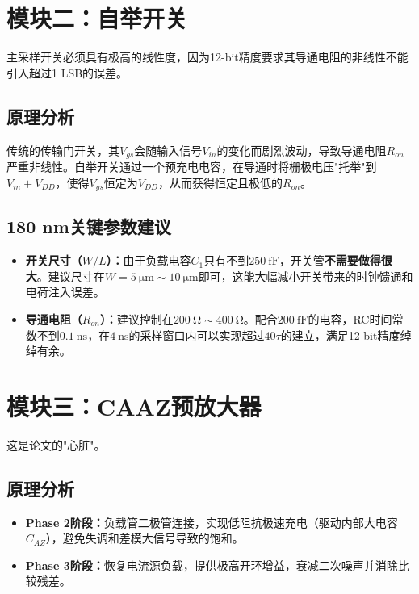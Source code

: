 \documentclass[11pt,a4paper,UTF8]{ctexart}
\begin{document}
\section{模块二：自举开关}

主采样开关必须具有极高的线性度，因为12-bit精度要求其导通电阻的非线性不能引入超过1 LSB的误差。

\subsection{原理分析}

传统的传输门开关，其$V_{gs}$会随输入信号$V_{in}$的变化而剧烈波动，导致导通电阻$R_{on}$严重非线性。自举开关通过一个预充电电容，在导通时将栅极电压"托举"到$V_{in} + V_{DD}$，使得$V_{gs}$恒定为$V_{DD}$，从而获得恒定且极低的$R_{on}$。

\subsection{180 nm关键参数建议}

\begin{itemize}[leftmargin=*]
    \item \textbf{开关尺寸（$W/L$）：}由于负载电容$C_1$只有不到$\SI{250}{\femto\farad}$，开关管\textbf{不需要做得很大}。建议尺寸在$W = \SI{5}{\micro\meter} \sim \SI{10}{\micro\meter}$即可，这能大幅减小开关带来的时钟馈通和电荷注入误差。
    
    \item \textbf{导通电阻（$R_{on}$）：}建议控制在\textbf{$\SI{200}{\ohm} \sim \SI{400}{\ohm}$}。配合$\SI{200}{\femto\farad}$的电容，RC时间常数不到$\SI{0.1}{\nano\second}$，在$\SI{4}{\nano\second}$的采样窗口内可以实现超过$40\tau$的建立，满足12-bit精度绰绰有余。
\end{itemize}

\section{模块三：CAAZ预放大器}

这是论文的"心脏"。

\subsection{原理分析}

\begin{itemize}[leftmargin=*]
    \item \textbf{Phase 2阶段：}负载管二极管连接，实现低阻抗极速充电（驱动内部大电容$C_{AZ}$），避免失调和差模大信号导致的饱和。
    \item \textbf{Phase 3阶段：}恢复电流源负载，提供极高开环增益，衰减二次噪声并消除比较残差。
\end{itemize}
\end{document}
